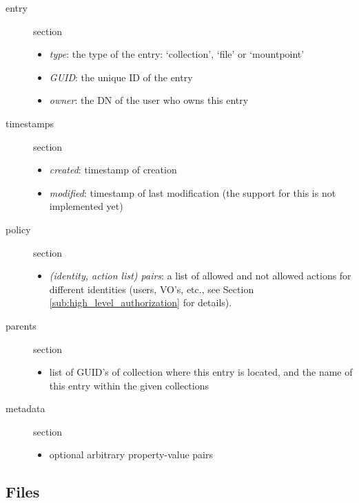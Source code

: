 \documentclass{book}
\begin{document}
\begin{description}
    \item [entry] section 
    \begin{itemize}
        \item \emph{type}: the type of the entry: `collection', `file' or `mountpoint'
        \item \emph{GUID}: the unique ID of the entry
        \item \emph{owner}: the DN of the user who owns this entry
    \end{itemize}
    \item [timestamps] section 
    \begin{itemize}
        \item \emph{created}: timestamp of creation 
        \item \emph{modified}: timestamp of last modification (the support for this is not implemented yet)
    \end{itemize}
    \item [policy] section 
    \begin{itemize}
        \item \emph{(identity, action list) pairs}: a list of allowed and not allowed actions for different identities (users, VO's, etc., see Section \ref{sub:high_level_authorization} for details). 
    \end{itemize}
    \item [parents] section
    \begin{itemize}
        \item list of GUID's of collection where this entry is located, and the name of this entry within the given collections
    \end{itemize}
    \item [metadata] section 
    \begin{itemize}
        \item optional arbitrary property-value pairs
    \end{itemize}
\end{description}

\subsection{Files} %
\label{sub:files}
\end{document}
